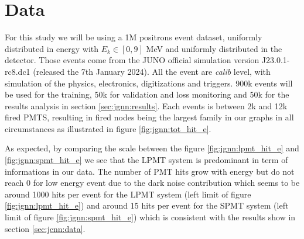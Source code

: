 \documentclass[../main.tex]{subfiles}
\begin{document}
\section{Data}

For this study we will be using a 1M positrons event dataset, uniformly distributed in energy with $E_k \in [0, 9]$ MeV and uniformly distributed in the detector. Those events come from the JUNO official simulation version J23.0.1-rc8.dc1 (released the 7th January 2024). All the event are \textit{calib} level, with simulation of the physics, electronics, digitizations and triggers. 900k events will be used for the training, 50k for validation and loss monitoring and 50k for the results analysis in section \ref{sec:jgnn:results}. Each events is between 2k and 12k fired PMTS, resulting in fired nodes being the largest family in our graphs in all circumstances as illustrated in figure \ref{fig:jgnn:tot_hit_e}.

As expected, by comparing the scale between the figure \ref{fig:jgnn:lpmt_hit_e} and \ref{fig:jgnn:spmt_hit_e} we see that the LPMT system is predominant in term of informations in our data. The number of PMT hits grow with energy but do not reach 0 for low energy event due to the dark noise contribution which seems to be around 1000 hits per event for the LPMT system (left limit of figure \ref{fig:jgnn:lpmt_hit_e}) and around 15 hits per event for the SPMT system (left limit of figure \ref{fig:jgnn:spmt_hit_e}) which is consistent with the results show in section \ref{sec:jcnn:data}.
\end{document}
